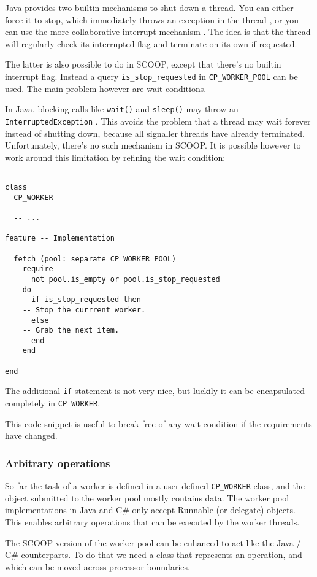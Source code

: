 \documentclass[a4paper,10pt]{report}
\begin{document}
Java provides two builtin mechanisms to shut down a thread.
You can either force it to stop, which immediately throws an exception in the thread , or you can use the more collaborative interrupt mechanism .
The idea is that the thread will regularly check its interrupted flag and terminate on its own if requested.

The latter is also possible to do in SCOOP, except that there's no builtin interrupt flag.
Instead a query \lstinline!is_stop_requested! in \lstinline!CP_WORKER_POOL! can be used.
The main problem however are wait conditions.

In Java, blocking calls like \lstinline!wait()! and \lstinline!sleep()! may throw an \lstinline!InterruptedException! .
This avoids the problem that a thread may wait forever instead of shutting down, because all signaller threads have already terminated.
Unfortunately, there's no such mechanism in SCOOP.
It is possible however to work around this limitation by refining the wait condition:
\begin{lstlisting}

class
  CP_WORKER
  
  -- ...
  
feature -- Implementation

  fetch (pool: separate CP_WORKER_POOL)
    require
      not pool.is_empty or pool.is_stop_requested
    do
      if is_stop_requested then
	-- Stop the currrent worker.
      else
	-- Grab the next item.
      end
    end

end
\end{lstlisting}
The additional \lstinline!if! statement is not very nice, but luckily it can be encapsulated completely in \lstinline!CP_WORKER!.

This code snippet is useful to break free of any wait condition if the requirements have changed.

\subsubsection{Arbitrary operations}
\label{sec:arbitrary-operations}

So far the task of a worker is defined in a user-defined \lstinline!CP_WORKER! class, and the object submitted to the worker pool mostly contains data.
The worker pool implementations in Java and C\# only accept Runnable (or delegate) objects.
This enables arbitrary operations that can be executed by the worker threads.

The SCOOP version of the worker pool can be enhanced to act like the Java / C\# counterparts.
To do that we need a class that represents an operation, and which can be moved across processor boundaries.
\end{document}
